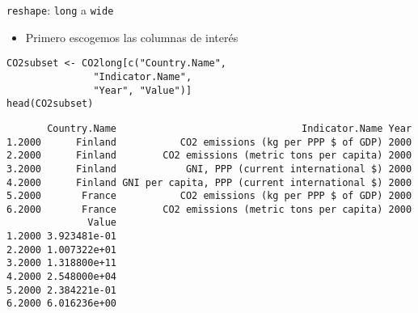 \documentclass[xcolor={usenames,svgnames,dvipsnames}]{beamer}
\begin{document}
\begin{frame}[fragile,label=sec-4-5]{\texttt{reshape}: \texttt{long} a \texttt{wide}}
 \begin{itemize}
\item Primero escogemos las columnas de interés
\end{itemize}
\lstset{language=R,numbers=none}
\begin{lstlisting}
CO2subset <- CO2long[c("Country.Name",
		       "Indicator.Name",
		       "Year", "Value")]
head(CO2subset)
\end{lstlisting}

\begin{verbatim}
       Country.Name                                Indicator.Name Year
1.2000      Finland           CO2 emissions (kg per PPP $ of GDP) 2000
2.2000      Finland        CO2 emissions (metric tons per capita) 2000
3.2000      Finland            GNI, PPP (current international $) 2000
4.2000      Finland GNI per capita, PPP (current international $) 2000
5.2000       France           CO2 emissions (kg per PPP $ of GDP) 2000
6.2000       France        CO2 emissions (metric tons per capita) 2000
              Value
1.2000 3.923481e-01
2.2000 1.007322e+01
3.2000 1.318800e+11
4.2000 2.548000e+04
5.2000 2.384221e-01
6.2000 6.016236e+00
\end{verbatim}
\end{frame}
\end{document}
